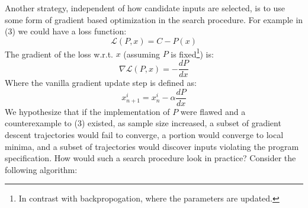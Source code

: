 \documentclass[12pt,initial,twoside,maitrise]{dms}
\numberwithin{equation}{section}
\numberwithin{table}{chapter}
\numberwithin{figure}{chapter}
\begin{document}

Another strategy, independent of how candidate inputs are selected, is to use some form of gradient based optimization in the search procedure. For example in (3) we could have a loss function:
%
\begin{equation}
    \mathcal{L}(P, x) = C - P(x)
\end{equation}
%
The gradient of the loss w.r.t. $x$ (assuming $P$ is fixed\footnote{In contrast with backpropogation, where the parameters are updated.}) is:
%
\begin{equation}
    \nabla \mathcal{L}(P, x) = - \frac{dP}{dx}
\end{equation}
%
Where the vanilla gradient update step is defined as:
%
\begin{equation}
    x_{n+1}^i=x_{n}^i - \alpha\frac{dP}{dx}
\end{equation}
%
We hypothesize that if the implementation of $P$ were flawed and a counterexample to (3) existed, as sample size increased, a subset of gradient descent trajectories would fail to converge, a portion would converge to local minima, and a subset of trajectories would discover inputs violating the program specification. How would such a search procedure look in practice? Consider the following algorithm:

%
%
\end{document}
